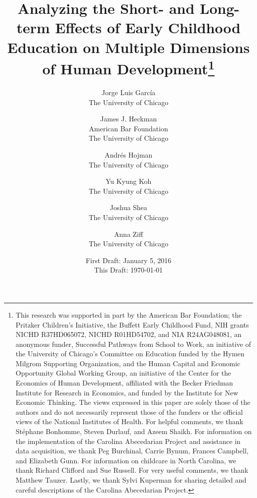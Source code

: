 




\title{\Large \textbf{Analyzing the Short- and Long-term Effects of Early Childhood Education on Multiple Dimensions of Human Development}\thanks{This research was supported in part by the American Bar Foundation; the Pritzker Children's Initiative, the
Buffett Early Childhood Fund, NIH grants NICHD R37HD065072, NICHD R01HD54702, and NIA R24AG048081, an
anonymous funder, Successful Pathways from School to Work, an initiative of the University of Chicago's Committee
on Education funded by the Hymen Milgrom Supporting Organization, and the Human Capital and Economic
Opportunity Global Working Group, an initiative of the Center for the Economics of Human Development, affiliated with
the Becker Friedman Institute for Research in Economics, and funded by the Institute for New Economic Thinking. The
views expressed in this paper are solely those of the authors and do not necessarily represent those of the funders or
the official views of the National Institutes of Health. For helpful comments, we thank St\'{e}phane Bonhomme, Steven Durlauf, and Azeem Shaikh. For information on the implementation of the Carolina Abecedarian Project and assistance in data acquisition, we thank Peg Burchinal, Carrie Bynum, Frances Campbell, and Elizabeth Gunn. For information on childcare in North Carolina, we thank Richard Clifford and Sue Russell. For very useful comments, we thank Matthew Tauzer. Lastly, we thank Sylvi Kuperman for sharing detailed and careful descriptions of the Carolina Abecedarian Project.}}

\author{
Jorge Luis Garc\'{i}a\\
The University of Chicago \and
James J. Heckman \\
American Bar Foundation \\
The University of Chicago \and
Andr\'{e}s Hojman\\
The University of Chicago \and
Yu Kyung Koh \\ 
The University of Chicago \and
Joshua Shea \\
The University of Chicago \and
Anna Ziff \\ 
The University of Chicago}
\date{First Draft: January 5, 2016\\ This Draft: \today}
\maketitle

